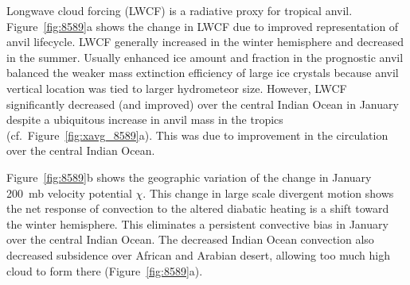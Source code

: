 \documentclass[twocolumn,twoside,final,10pt]{article}
\begin{document}
Longwave cloud forcing (LWCF) is a radiative proxy for tropical anvil.
Figure~\ref{fig:8589}a shows the change in LWCF due to improved
representation of anvil lifecycle.
LWCF generally increased in the winter hemisphere and decreased in the
summer.
Usually enhanced ice amount and fraction in the prognostic
anvil balanced the weaker mass extinction efficiency of large ice
crystals because anvil vertical location was tied to larger
hydrometeor size.  
However, LWCF significantly decreased (and improved) over the central
Indian Ocean in January despite a ubiquitous increase in anvil mass in
the tropics (cf.\ Figure~\ref{fig:xavg_8589}a).  
This was due to improvement in the circulation over the central Indian
Ocean.

Figure~\ref{fig:8589}b shows the geographic variation of the change in
January 200~mb velocity potential $\chi$.
This change in large scale divergent motion shows the net response of
convection to the altered diabatic heating is a shift toward the
winter hemisphere.
This eliminates a persistent convective bias in January over the
central Indian Ocean.
The decreased Indian Ocean convection also decreased subsidence over
African and Arabian desert, allowing too much high cloud to form there
(Figure~\ref{fig:8589}a). 

\label{sec:anv_cnc}
\end{document}
